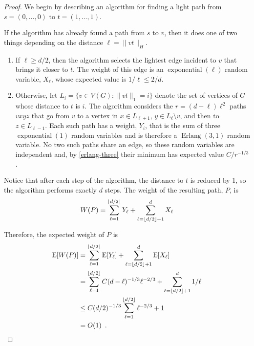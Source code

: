 \documentclass[lotsofwhite]{patmorin}
\DeclareMathOperator{\exponential}{exponential}
\DeclareMathOperator{\erlang}{Erlang}
\begin{document}
\begin{proof}
  We begin by describing an algorithm for finding a light path from
  $s=(0,\ldots,0)$ to $t=(1,\ldots,1)$.  

  If the algorithm has already found a path from $s$
  to $v$, then it does one of two things depending on the distance
  $\ell=\|vt\|_H$.
  \begin{enumerate}
     \item If $\ell \ge d/2$, then the algorithm selects the lightest
     edge incident to $v$ that brings it closer to $t$. The weight of
     this edge is an $\exponential(\ell)$ random variable, $X_\ell$,
     whose expected value is $1/\ell\le 2/d$.

   \item Otherwise, let $L_i = \{ v\in V(G) : \|vt\|_1=i\}$ denote the
    set of vertices of $G$ whose distance to $t$ is $i$.  The algorithm
    considers the $r=(d-\ell)\ell^2$ paths $vxyz$ that go from $v$ to
    a vertex in $x\in L_{\ell+1}$, $y\in L_{\ell}\setminus v$, and then
    to $z\in L_{\ell-1}$.  Each such path has a weight, $Y_i$, that is
    the sum of three $\exponential(1)$ random variables and is therefore
    a $\erlang(3,1)$ random variable.  No two such paths share an edge,
    so these random variables are independent and, by \eqref{erlang-three}
    their minimum has expected value $C/r^{-1/3}$.
  \end{enumerate}
  Notice that after each step of the algorithm, the distance to $t$ is
  reduced by 1, so the algorithm performs exactly $d$ steps.  The weight
  of the resulting path, $P$, is
  \begin{equation}
     W(P)  = \sum_{\ell=1}^{\lfloor d/2\rfloor} Y_\ell +
              \sum_{\ell=\lfloor d/2\rfloor+1}^d X_\ell
     \eqlabel{foxtrot-weight}
  \end{equation}
  
  Therefore, the expected weight of $P$ is 
  \begin{align*}
      \mathrm{E}[W(P)] & = \sum_{\ell=1}^{\lfloor d/2\rfloor} \mathrm{E}[Y_\ell] +
              \sum_{\ell=\lfloor d/2\rfloor+1}^d \mathrm{E}[X_\ell] \\
    & = \sum_{\ell=1}^{\lfloor d/2\rfloor} C(d-\ell)^{-1/3}\ell^{-2/3} +
     \sum_{\ell=\lfloor d/2\rfloor+1}^d 1/\ell \\
     & \le
     C(d/2)^{-1/3}\sum_{\ell=1}^{\lfloor d/2\rfloor} \ell^{-2/3} + 1 \\
     & = O(1) \enspace .
  \end{align*}


\end{proof}
\end{document}
